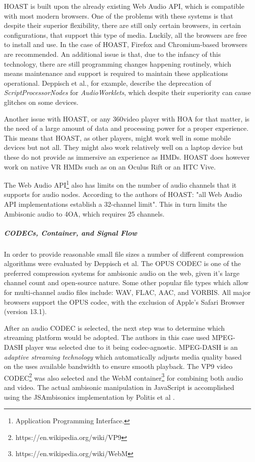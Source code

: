 HOAST is built upon the already existing Web Audio API, which is compatible with most modern browsers. One of the problems with these systems is that despite their superior flexibility, there are still only certain browsers, in certain configurations, that support this type of media. Luckily, all the browsers are free to install and use. In the case of HOAST, Firefox and Chromium-based browsers are recommended. An additional issue is that, due to the infancy of this technology, there are still programming changes happening routinely, which means maintenance and support is required to maintain these applications operational. Deppisch et al., for example, describe the deprecation of \textit{ScriptProcessorNodes} for \textit{AudioWorklets}, which despite their superiority can cause glitches on some devices. 

Another issue with HOAST, or any 360\textdegree video player with HOA for that matter, is the need of a large amount of data and processing power for a proper experience. This means that HOAST, as other players, might work well in some mobile devices but not all. They might also work relatively well on a laptop device but these do not provide as immersive an experience as HMDs. HOAST does however work on native VR HMDs such as on an Oculus Rift or an HTC Vive. 

The Web Audio API\footnote{Application Programming Interface.} also has limits on the number of audio channels that it supports for audio nodes. According to the authors of HOAST: "all Web Audio API implementations establish a 32-channel limit". This in turn limits the Ambisonic audio to 4OA, which requires 25 channels. 

\subparagraph{CODECs, Container, and Signal Flow}

In order to provide reasonable small file sizes a number of different compression algorithms were evaluated by Deppisch et al. The OPUS CODEC is one of the preferred compression systems for ambisonic audio on the web, given it's large channel count and open-source nature. Some other popular file types which allow for multi-channel audio files include: WAV, FLAC, AAC, and VORBIS. All major browsers support the OPUS codec, with the exclusion of Apple's Safari Browser (version 13.1). 

After an audio CODEC is selected, the next step was to determine which streaming platform would be adopted. The authors in this case used MPEG-DASH player was selected due to it being codec-agnostic. MPEG-DASH is an \textit{adaptive streaming technology} which automatically adjusts media quality based on the uses available bandwidth to ensure smooth playback. The VP9 video CODEC\footnote{https://en.wikipedia.org/wiki/VP9} was also selected and the WebM container\footnote{https://en.wikipedia.org/wiki/WebM} for combining both audio and video. The actual ambisonic manipulation in JavaScript is accomplished using the JSAmbisonics implementation by Politis et al \cite{politis2016jsambisonics}.

